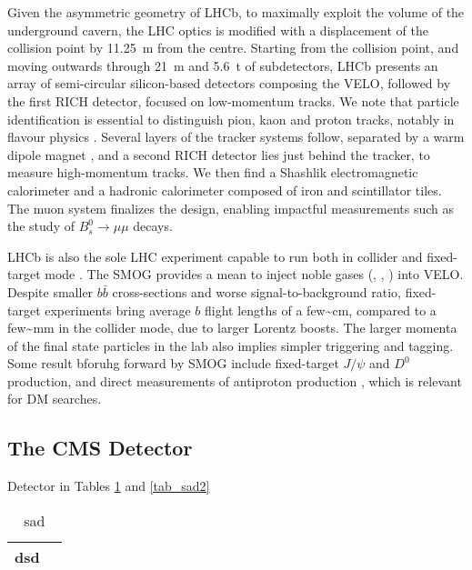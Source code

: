 \documentclass[11pt]{article}
\newcommand{\bb}{$b\bar{b}$}
\newcommand{\jpsi}{$J/\psi$}
\begin{document}
Given the asymmetric geometry of LHCb, to maximally exploit the volume of the underground cavern, the LHC optics is modified  with a displacement of the collision point by \SI{11.25}{\m} from the centre.
Starting from the collision point, and moving outwards through \SI{21}{\m} and \SI{5.6}{\tonne} of subdetectors, \ac{LHCb} presents an array of semi-circular silicon-based detectors composing the \ac{VELO}, followed by the first \ac{RICH} detector, focused on low-momentum tracks.
We note that particle identification is essential to distinguish pion, kaon and proton tracks, notably in flavour physics \cite{lhcb_hllhc_tdr}.
Several layers of the tracker systems follow, separated by a warm dipole magnet \cite{lhcb_collab_tracker_tdr}, and a second \ac{RICH} detector lies just behind the tracker, to measure high-momentum tracks.
We then find a Shashlik electromagnetic calorimeter and a hadronic calorimeter composed of iron and scintillator tiles.
The muon system finalizes the design, enabling impactful measurements such as the study of \(B_{s}^{0}\rightarrow\mu\mu\) decays.

\ac{LHCb} is also the sole \ac{LHC} experiment capable to run both in collider and fixed-target mode \cite{lhcb_fixed_target}.
The \ac{SMOG} provides a mean to inject noble gases (, , ) into \ac{VELO}.
Despite smaller \bb{} cross-sections and worse signal-to-background ratio, fixed-target experiments bring average \(b\) flight lengths of a few\textasciitilde{}\si{\cm}, compared to a few\textasciitilde{}\si{\mm} in the collider mode, due to larger Lorentz boosts.
The larger momenta of the final state particles in the lab also implies simpler triggering and tagging.
Some result bforuhg forward by \ac{SMOG} include fixed-target \jpsi{} and \(D^{0}\) production, and direct measurements of antiproton production \cite{antimatter_prod_fixed_target_lhcb}, which is relevant for \ac{DM} searches.


\cite{bb_pairs1,bbpairs2}
\subsection{The CMS Detector}
\label{sec:org022e093}
\label{sec:cms_detector}

Detector in Tables \cref{tab_sad} and \cref{tab_sad2}

\begin{table}[htbp]
\centering
\begin{tabular}{ll}
dsd & \\[0pt]
\hline
\end{tabular}
\caption{\label{tab_sad}sad}

\end{table}
\end{document}
